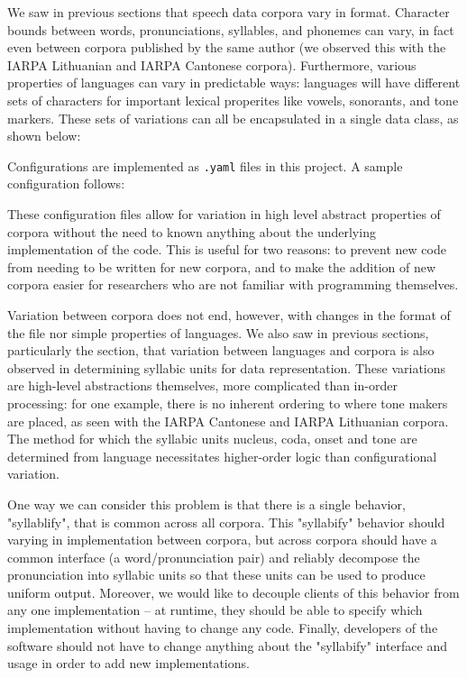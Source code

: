 \documentclass[11pt]{article}
\begin{document}
We saw in previous sections that speech data corpora vary in format. Character bounds between words, pronunciations, syllables, and phonemes can vary, in fact even between corpora published by the same author (we observed this with the IARPA Lithuanian and IARPA Cantonese corpora). Furthermore, various properties of languages can vary in predictable ways: languages will have different sets of characters for important lexical properites like vowels, sonorants, and tone markers. These sets of variations can all be encapsulated in a single data class, as shown below:


Configurations are implemented as \verb|.yaml| files in this project. A sample configuration follows:


These configuration files allow for variation in high level abstract properties of corpora without the need to known anything about the underlying implementation of the code. This is useful for two reasons: to prevent new code from needing to be written for new corpora, and to make the addition of new corpora easier for researchers who are not familiar with programming themselves.

Variation between corpora does not end, however, with changes in the format of the file nor simple properties of languages. We also saw in previous sections, particularly the  section, that variation between languages and corpora is also observed in determining syllabic units for data representation. These variations are high-level abstractions themselves, more complicated than in-order processing: for one example, there is no inherent ordering to where tone makers are placed, as seen with the IARPA Cantonese and IARPA Lithuanian corpora. The method for which the syllabic units nucleus, coda, onset and tone are determined from language necessitates higher-order logic than configurational variation.

One way we can consider this problem is that there is a single behavior, "syllablify", that is common across all corpora. This "syllabify" behavior should varying in implementation between corpora, but across corpora should have a common interface (a word/pronunciation pair) and reliably decompose the pronunciation into syllabic units so that these units can be used to produce uniform output. Moreover, we would like to decouple clients of this behavior from any one implementation -- at runtime, they should be able to specify which implementation without having to change any code. Finally, developers of the software should not have to change anything about the "syllabify" interface and usage in order to add new implementations. 
\end{document}
